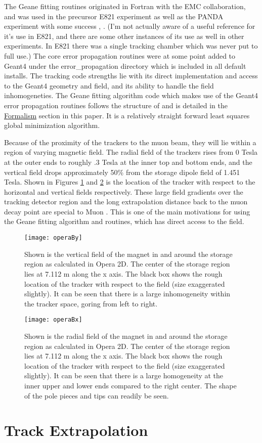 The Geane fitting routines originated in Fortran with the EMC collaboration, and was used in the precursor E821 experiment as well as the PANDA experiment with some success \cite{geanemanual}, \cite{Lavezzi}. (I'm not actually aware of a useful reference for it's use in E821, and there are some other instances of its use as well in other experiments. In E821 there was a single tracking chamber which was never put to full use.) The core error propagation routines were at some point added to Geant4 under the error\_propagation directory which is included in all default installs. The tracking code strengths lie with its direct implementation and access to the Geant4 geometry and field, and its ability to handle the field inhomogeneties. The Geane fitting algorithm code which makes use of the Geant4 error propagation routines follows the structure of \cite{geanemanual} and is detailed in the \hyperref[sec:Formalism]{Formalism} section in this paper. It is a relatively straight forward least squares global \chisq minimization algorithm. 


Because of the proximity of the trackers to the muon beam, they will lie within a region of varying magnetic field. The radial field of the trackers rises from 0 Tesla at the outer ends to roughly .3 Tesla at the inner top and bottom ends, and the vertical field drops approximately 50\% from the storage dipole field of 1.451 Tesla. Shown in Figures \ref{fig:operaBy} and \ref{fig:operaBx} is the location of the tracker with respect to the horizontal and vertical fields respectively. These large field gradients over the tracking detector region and the long extrapolation distance back to the muon decay point are special to Muon \gmtwo. This is one of the main motivations for using the Geane fitting algorithm and routines, which has direct access to the field.

\begin{figure}[]
	\caption[Vertical magnetic field from Opera2D]{Shown is the vertical field of the \gmtwo magnet in and around the storage region as calculated in Opera 2D. The center of the storage region lies at 7.112 m along the x axis. The black box shows the rough location of the tracker with respect to the field (size exaggerated slightly). It can be seen that there is a large inhomogeneity within the tracker space, goring from left to right.}
	\centering
	\texttt{[image: operaBy]}
	\label{fig:operaBy}
\end{figure}

\begin{figure}[]
	\caption[Horizontal magnetic field from Opera2D]{Shown is the radial field of the \gmtwo magnet in and around the storage region as calculated in Opera 2D. The center of the storage region lies at 7.112 m along the x axis. The black box shows the rough location of the tracker with respect to the field (size exaggerated slightly). It can be seen that there is a large homogeneity at the inner upper and lower ends compared to the right center. The shape of the pole pieces and tips can readily be seen.}
	\centering
	\texttt{[image: operaBx]}
	\label{fig:operaBx}
\end{figure}





\section{Track Extrapolation}
\label{sec:Track Extrapolation}
